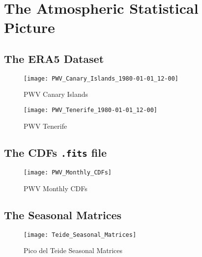 \chapter{The Atmospheric Statistical Picture}

\section{The ERA5 Dataset}

\begin{figure}
        \centering
        \texttt{[image: PWV\_Canary\_Islands\_1980-01-01\_12-00]}
        \caption{PWV Canary Islands}
        \label{fig:pwv_canary_islands}
\end{figure}

\begin{figure}
        \centering
        \texttt{[image: PWV\_Tenerife\_1980-01-01\_12-00]}
        \caption{PWV Tenerife}
        \label{fig:pwv_tenerife}
\end{figure}

\section{The CDFs \texttt{.fits} file}

\begin{figure}
        \centering
        \texttt{[image: PWV\_Monthly\_CDFs]}
        \caption{PWV Monthly CDFs}
        \label{fig:pwv_monthly_cdfs}
\end{figure}

\section{The Seasonal Matrices}

\begin{figure}
        \centering
        \texttt{[image: Teide\_Seasonal\_Matrices]}
        \caption{Pico del Teide Seasonal Matrices}
        \label{fig:teide_seasonal_matrices}
\end{figure}

